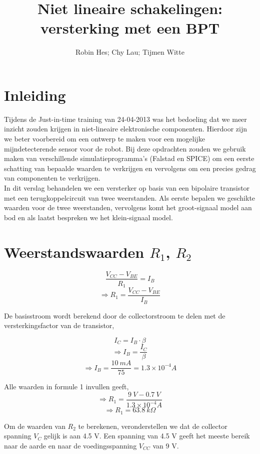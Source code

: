 \documentclass{article}
\title{Niet lineaire schakelingen: versterking met een BPT}
\author{Robin Hes; Chy Lau; Tijmen Witte}
\begin{document}
\maketitle

\section*{Inleiding}

Tijdens de Just-in-time training van 24-04-2013 was het bedoeling dat we meer inzicht zouden krijgen in niet-lineaire elektronische componenten. Hierdoor 
zijn we beter voorbereid om een ontwerp te maken voor een mogelijke mijndetecterende sensor voor de robot. Bij deze opdrachten zouden we gebruik maken van verschillende simulatieprogramma's (Falstad en SPICE) om een eerste schatting van bepaalde waarden te verkrijgen en vervolgens om een precies gedrag van componenten te verkrijgen.
\\

\noindent
In dit verslag behandelen we een versterker op basis van een bipolaire transistor met een terugkoppelcircuit van twee weerstanden. Als eerste bepalen we geschikte waarden voor de twee weerstanden, vervolgens komt het groot-signaal model aan bod en als laatst bespreken we het klein-signaal model.

\section*{Weerstandswaarden $R_1$, $R_2$}

\begin{equation}
\frac{V_{CC}-V_{BE}}{R_1}=I_B 
\end{equation}
$$\Rightarrow R_1=\frac{V_{CC}-V_{BE}}{I_B}$$

\noindent De basisstroom wordt berekend door de collectorstroom te delen met de versterkingsfactor van de transistor,

\begin{equation}
I_C=I_B \cdot \beta
\end{equation}
$$\Rightarrow I_B=\frac{I_C}{\beta}$$
$$\Rightarrow I_B=\frac{10 \: mA}{75}=1.3\times 10^{-4}A$$

\noindent Alle waarden in formule 1 invullen geeft,
$$\Rightarrow R_1=\frac{9\: V-0.7\: V}{1.3\times 10^{-4}A}$$
$$\Rightarrow R_1=63.8 \: k  \Omega$$

\noindent Om de waarden van $R_2$ te berekenen, veronderstellen we dat de collector spanning $V_C$ gelijk is aan 4.5 V. Een spanning van 4.5 V geeft het meeste bereik naar de aarde en naar de voedingsspanning $V_{CC}$ van 9 V. 
\end{document}
